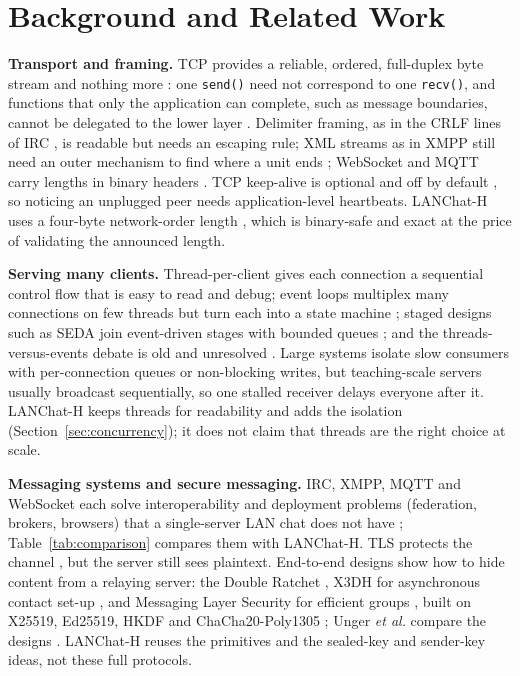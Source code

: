 \documentclass[conference]{IEEEtran}
\newcommand{\code}[1]{\texttt{#1}}
\begin{document}
\section{Background and Related Work}\label{sec:related}
\textbf{Transport and framing.} TCP provides a reliable, ordered, full-duplex byte stream and nothing more \cite{rfc9293,rfc793,jacobson,rfc5681,tanenbaum,kurose}: one \code{send()} need not correspond to one \code{recv()}, and functions that only the application can complete, such as message boundaries, cannot be delegated to the lower layer \cite{stevens,saltzer}. Delimiter framing, as in the CRLF lines of IRC \cite{rfc1459}, is readable but needs an escaping rule; XML streams as in XMPP still need an outer mechanism to find where a unit ends \cite{rfc6120}; WebSocket and MQTT carry lengths in binary headers \cite{rfc6455,mqtt5}. TCP keep-alive is optional and off by default \cite{rfc1122}, so noticing an unplugged peer needs application-level heartbeats. LANChat-H uses a four-byte network-order length \cite{pystruct,rfc3629}, which is binary-safe and exact at the price of validating the announced length.

\textbf{Serving many clients.} Thread-per-client gives each connection a sequential control flow that is easy to read and debug; event loops multiplex many connections on few threads but turn each into a state machine \cite{kegel,krohn}; staged designs such as SEDA join event-driven stages with bounded queues \cite{seda}; and the threads-versus-events debate is old and unresolved \cite{ousterhout,vonbehren,lee,flash}. Large systems isolate slow consumers with per-connection queues or non-blocking writes, but teaching-scale servers usually broadcast sequentially, so one stalled receiver delays everyone after it. LANChat-H keeps threads for readability and adds the isolation (Section~\ref{sec:concurrency}); it does not claim that threads are the right choice at scale.

\textbf{Messaging systems and secure messaging.} IRC, XMPP, MQTT and WebSocket each solve interoperability and deployment problems (federation, brokers, browsers) that a single-server LAN chat does not have \cite{rfc1459,rfc2812,rfc6120,rfc6121,mqtt5,rfc6455}; Table~\ref{tab:comparison} compares them with LANChat-H. TLS protects the channel \cite{rfc8446}, but the server still sees plaintext. End-to-end designs show how to hide content from a relaying server: the Double Ratchet \cite{signal,cohngordon}, X3DH for asynchronous contact set-up \cite{x3dh}, and Messaging Layer Security for efficient groups \cite{rfc9420}, built on X25519, Ed25519, HKDF and ChaCha20-Poly1305 \cite{rfc7748,rfc8032,rfc5869,rfc8439}; Unger \emph{et al.} compare the designs \cite{unger}. LANChat-H reuses the primitives and the sealed-key and sender-key ideas, not these full protocols.
\end{document}
